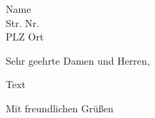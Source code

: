 \documentclass[fontsize=11]{scrlttr2}
\begin{document}
\begin{letter}{Name\\Str. Nr.\\PLZ Ort}
\opening{Sehr geehrte Damen und Herren,}

Text

\renewcommand\raggedsignature{\raggedright}
\closing{Mit freundlichen Grüßen}
\end{letter}
\end{document}
